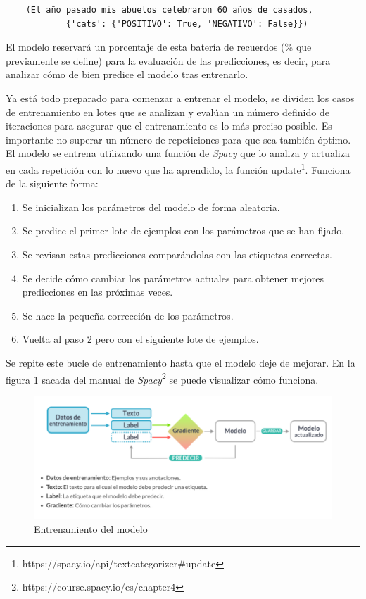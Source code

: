 \begin{verbatim}
	(El año pasado mis abuelos celebraron 60 años de casados, 
			{'cats': {'POSITIVO': True, 'NEGATIVO': False}}) 
\end{verbatim}


El modelo reservará un porcentaje de esta batería de recuerdos (\% que previamente se define) para la evaluación de las predicciones, es decir, para analizar cómo de bien predice el modelo tras entrenarlo. 

Ya está todo preparado para comenzar a entrenar el modelo, se dividen los casos de entrenamiento en lotes que se analizan y evalúan un número definido de iteraciones para asegurar que el entrenamiento es lo más preciso posible. Es importante no superar un número de repeticiones para que sea también óptimo. El modelo se entrena utilizando una función de \textit{Spacy} que lo analiza y actualiza en cada repetición con lo nuevo que ha aprendido, la función update\footnote{https://spacy.io/api/textcategorizer\#update}. Funciona de la siguiente forma: 
\begin{enumerate}
	\item Se inicializan los parámetros del modelo de forma aleatoria.
	\item Se predice el primer lote de ejemplos con los parámetros que se han fijado.
	\item Se revisan estas predicciones comparándolas con las etiquetas correctas.
	\item Se decide cómo cambiar los parámetros actuales para obtener mejores predicciones en las próximas veces.
	\item Se hace la pequeña corrección de los parámetros.
	\item Vuelta al paso 2 pero con el siguiente lote de ejemplos.
\end{enumerate}
Se repite este bucle de entrenamiento hasta que el modelo deje de mejorar. En la figura \ref{fig:entrenamiento} sacada del manual de \textit{Spacy}\footnote{https://course.spacy.io/es/chapter4} se puede visualizar cómo funciona. 

\begin{figure}[h]
	\centering
	\includegraphics[scale=0.5]{Imagenes/Vectorial/entrenamiento_modelo}
	\caption{Entrenamiento del modelo}
	\label{fig:entrenamiento}
\end{figure}

